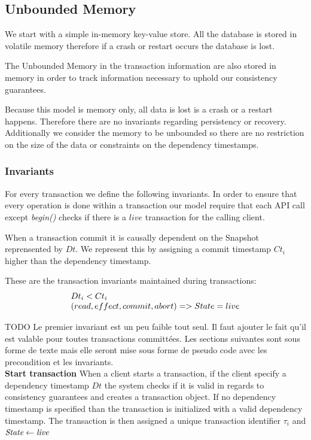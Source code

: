 \documentclass[systeme]{compas2022}
\begin{document}
\subsection{Unbounded Memory}

We start with a simple in-memory key-value store.
All the database is stored in volatile memory therefore if a crash or restart occurs the database is lost.

The Unbounded Memory in  the transaction information are also stored in memory in order to track information necessary to uphold our consistency guarantees.

Because this model is memory only, all data is lost is a crash or a restart happens.
Therefore there are no invariants regarding persistency or recovery.
Additionally we consider the memory to be unbounded so there are no restriction on the size of the data or constraints on the dependency timestamps.

\subsubsection{Invariants}

For every transaction we define the following invariants.
In order to ensure that every operation is done within a transaction our model require that each API call except \emph{begin()} checks if there is a $live$ transaction for the calling client.

When a transaction commit it is causally dependent on the Snapshot reprensented by $Dt$.
We represent this by assigning a commit timestamp $Ct_i$ higher than the dependency timestamp.

These are the transaction invariants maintained during transactions:
\[
  \begin{array}{lcl}
    \emph{$Dt_i < Ct_i$}\\
    \emph{$(read, effect, commit, abort) => State = live$}
  \end{array} 
\]


TODO Le premier invariant est un peu faible tout seul. Il faut ajouter le fait qu'il est valable pour toutes transactions committées. Les sections suivantes sont sous forme de texte mais elle seront mise sous forme de pseudo code avec les precondition et les invariants.\\


\textbf{Start transaction}
When a client starts a transaction, if the client specify a dependency timestamp $Dt$ the system checks if it is valid in regards to consistency guarantees and creates a transaction object.
If no dependency timestamp is specified than the transaction is initialized with a valid dependency timestamp.
The transaction is then assigned a unique transaction identifier $\tau_i$ and $\emph{State} \leftarrow \emph{live}$ \\
\end{document}
